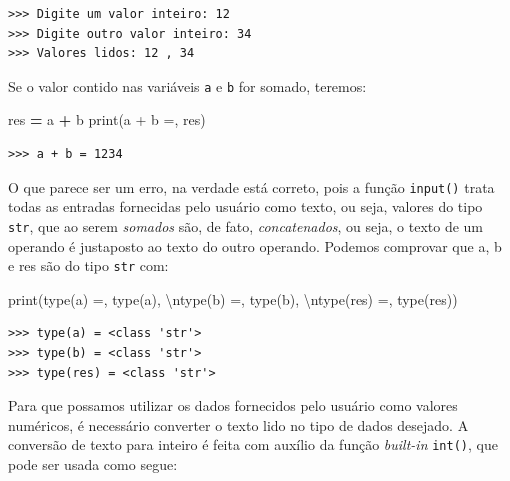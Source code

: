 \documentclass[
]{book}
\newenvironment{Shaded}{\begin{snugshade}}{\end{snugshade}}
\newcommand{\BuiltInTok}[1]{#1}
\newcommand{\CharTok}[1]{\textcolor[rgb]{0.31,0.60,0.02}{#1}}
\newcommand{\NormalTok}[1]{#1}
\newcommand{\OperatorTok}[1]{\textcolor[rgb]{0.81,0.36,0.00}{\textbf{#1}}}
\newcommand{\StringTok}[1]{\textcolor[rgb]{0.31,0.60,0.02}{#1}}
\begin{document}
\begin{verbatim}
>>> Digite um valor inteiro: 12
>>> Digite outro valor inteiro: 34
>>> Valores lidos: 12 , 34
\end{verbatim}

Se o valor contido nas variáveis \texttt{a} e \texttt{b} for somado, teremos:

\begin{Shaded}
\begin{Highlighting}[]
\NormalTok{res }\OperatorTok{=}\NormalTok{ a }\OperatorTok{+}\NormalTok{ b}
\BuiltInTok{print}\NormalTok{(}\StringTok{\textquotesingle{}a + b =\textquotesingle{}}\NormalTok{, res)}
\end{Highlighting}
\end{Shaded}

\begin{verbatim}
>>> a + b = 1234
\end{verbatim}

O que parece ser um erro, na verdade está correto, pois a função \texttt{input()} trata todas as entradas fornecidas pelo usuário como texto, ou seja, valores do tipo \texttt{str}, que ao serem \emph{somados} são, de fato, \emph{concatenados}, ou seja, o texto de um operando é justaposto ao texto do outro operando. Podemos comprovar que a, b e res são do tipo \texttt{str} com:

\begin{Shaded}
\begin{Highlighting}[]
\BuiltInTok{print}\NormalTok{(}\StringTok{\textquotesingle{}type(a) =\textquotesingle{}}\NormalTok{, }\BuiltInTok{type}\NormalTok{(a), }\StringTok{\textquotesingle{}}\CharTok{\textbackslash{}n}\StringTok{type(b) =\textquotesingle{}}\NormalTok{, }\BuiltInTok{type}\NormalTok{(b),}
    \StringTok{\textquotesingle{}}\CharTok{\textbackslash{}n}\StringTok{type(res) =\textquotesingle{}}\NormalTok{, }\BuiltInTok{type}\NormalTok{(res))}
\end{Highlighting}
\end{Shaded}

\begin{verbatim}
>>> type(a) = <class 'str'> 
>>> type(b) = <class 'str'> 
>>> type(res) = <class 'str'>
\end{verbatim}

Para que possamos utilizar os dados fornecidos pelo usuário como valores numéricos, é necessário converter o texto lido no tipo de dados desejado. A conversão de texto para inteiro é feita com auxílio da função \emph{built-in} \texttt{int()}, que pode ser usada como segue:
\end{document}
